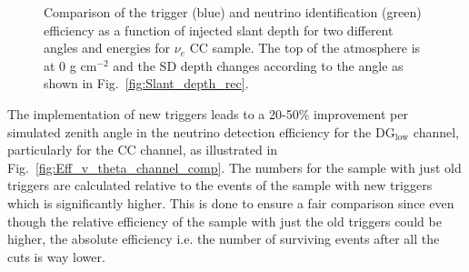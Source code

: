 \begin{figure}[h!]
  \centering
  \hfill
  \caption{Comparison of the trigger (blue) and neutrino identification (green) efficiency as a function of injected slant depth for two different angles and energies for $\nu_e$ CC sample. The top of the atmosphere is at 0 g cm$^{-2}$ and the SD depth changes according to the angle as shown in Fig.~\ref{fig:Slant_depth_rec}.} 
  \label{fig:Eff_X_comp}
\end{figure}

The implementation of new triggers leads to a 20-50\% improvement per simulated zenith angle in the neutrino detection efficiency for the DG$_{\mathrm{low}}$ channel, particularly for the CC channel, as illustrated in Fig.~\ref{fig:Eff_v_theta_channel_comp}. The numbers for the sample with just old triggers are calculated relative to the events of the sample with new triggers which is significantly higher. This is done to ensure a fair comparison since even though the relative efficiency of the sample with just the old triggers could be higher, the absolute efficiency i.e. the number of surviving events after all the cuts is way lower. 

